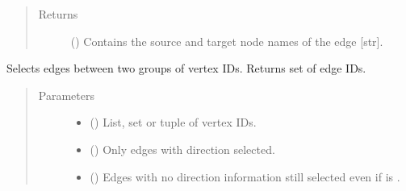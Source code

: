 \documentclass[letterpaper,10pt,english]{sphinxmanual}
\begin{document}
\begin{fulllineitems}
\begin{fulllineitems}
\begin{quote}
\begin{description}
\item[{Returns}] \leavevmode
() \textendash{} Contains the source and target node names of
the edge {[}str{]}.

\end{description}\end{quote}

\end{fulllineitems}


\begin{fulllineitems}
\label{\detokenize{reference:pypath.main.PyPath.edges_3d}}
\end{fulllineitems}


\begin{fulllineitems}
\label{\detokenize{reference:pypath.main.PyPath.edges_between}}
Selects edges between two groups of vertex IDs.
Returns set of edge IDs.
\begin{quote}\begin{description}
\item[{Parameters}] \leavevmode\begin{itemize}
\item {} 
\sphinxstyleliteralstrong{\sphinxupquote{,}} () \textendash{} List, set or tuple of vertex IDs.

\item {} 
 () \textendash{} Only edges with direction  selected.

\item {} 
 () \textendash{} Edges with no direction information still selected even if
 is .


\end{itemize}
\end{description}
\end{quote}
\end{fulllineitems}
\end{fulllineitems}
\end{document}
